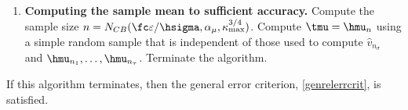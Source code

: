 \documentclass[graybox]{svmult}
\newcommand{\hv}{\hat{v}}
\begin{document}
\begin{theorem}
\begin{enumerate}
\begin{enumerate}
\item \label{newhvarepsstep} Else, compute the next tolerance for the sample mean
\begin{gather*}
\hvareps_{0} = \begin{cases}
\displaystyle \frac{(1-\hdelta)(1-\theta)}{\hdelta \theta} -\abs{\hmu_{n_i}}, & 
\displaystyle 0 \le \abs{\hmu_{n_i}}  < \frac{(1-\hdelta)(1-\theta)}{2 \hdelta \theta},
 \\[2ex]
\displaystyle \frac{1-\hdelta}{1+\hdelta} \left[\frac{1-\theta}{\theta} +\abs{\hmu_{n_i}}\right], & 
\displaystyle \frac{(1-\hdelta)(1-\theta)}{2 \hdelta \theta} \le \abs{\hmu_{n_i}}  < \infty,
\end{cases}\\
\hvareps_{i+1} = \max(\min(\hvareps_0, \tdelta \hvareps_i), \delta \hvareps_i).
\end{gather*}


\item Define the next sample size, $n_{i+1} = N_{CB}(\hvareps_{i+1}/\hsigma,\alpha_{i+1},\kappa_{\max}^{3/4})$,
increase $i$ by one, and go to step a). 

\end{enumerate}

\item \label{hmufinalstep} {\bf Computing the sample mean to sufficient accuracy.} Compute the sample size  $n = N_{CB}(\fc \varepsilon/\hsigma,\alpha_\mu,\kappa_{\max}^{3/4})$. Compute $\tmu=\hmu_{n}$ using a simple random sample that is independent of those used to compute $\hv_{n_{\sigma}}$ and $\hmu_{n_1}, \ldots, \hmu_{n_{\tau}}$. Terminate the algorithm.

\end{enumerate}
If this algorithm terminates, then the general error criterion, \eqref{genrelerrcrit}, is satisfied.

\end{theorem}
\end{document}

